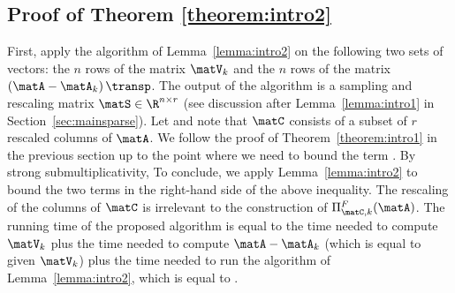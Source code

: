 \subsection{Proof of Theorem \ref{theorem:intro2}}  First,
apply the algorithm of Lemma~\ref{lemma:intro2}
on the following two sets of vectors: the $n$ rows of the matrix $\matV_k$ and the $n$ rows of the matrix $\left(\matA-\matA_k\right)\transp$. The output of the algorithm is a sampling and rescaling matrix $\matS \in {\R}^{n \times r}$ (see discussion after Lemma~\ref{lemma:intro1} in Section~\ref{sec:mainsparse}). Let \math{\matC=\matA \matS} and note that $\matC$ consists of a subset of $r$ rescaled
 columns of $\matA$. We follow the proof of Theorem~\ref{theorem:intro1} in the previous section up to the point where we need to bound the term
.
By strong submultiplicativity,
To conclude, we apply Lemma~\ref{lemma:intro2} to bound the two terms in the right-hand side of the above inequality. The rescaling of the columns of $\matC$ is irrelevant to the construction of $\Pi_{\matC,k}^F(\matA)$. The running time of the proposed algorithm is equal to the time needed to compute $\matV_k$ plus the time needed to compute $\matA-\matA_k$ (which is equal to  given $\matV_k$) plus the time needed to run the algorithm of Lemma~\ref{lemma:intro2}, which is equal to .

